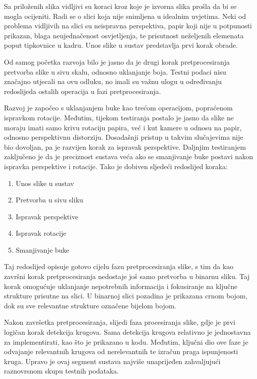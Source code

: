 \documentclass{foi}
\begin{document}
Sa priloženih slika vidljivi su koraci kroz koje je izvorna slika prošla da bi se mogla ocijeniti. Radi se o slici koja nije snimljena u idealnim uvjetima. Neki od problema vidljivih na slici su neispravna perspektiva, papir koji nije u potpunosti prikazan, blaga neujednačenost osvjetljenja, te prisutnost neželjenih elemenata poput tipkovnice u kadru. Unos slike u sustav predstavlja prvi korak obrade.

Od samog početka razvoja bilo je jasno da je drugi korak pretprocesiranja pretvorba slike u sivu skalu, odnosno uklanjanje boja. Testni podaci nisu značajno utjecali na ovu odluku, no imali su važnu ulogu u određivanju redoslijeda ostalih operacija u fazi pretprocesiranja.

Razvoj je započeo s uklanjanjem buke kao trećom operacijom, popraćenom ispravkom rotacije. Međutim, tijekom testiranja postalo je jasno da slike ne moraju imati samo krivu rotaciju papira, već i kut kamere u odnosu na papir, odnosno perspektivnu distorziju. Dosadašnji pristup u takvim slučajevima nije bio dovoljan, pa je razvijen korak za ispravak perspektive. Daljnjim testiranjem zaključeno je da je preciznost sustava veća ako se smanjivanje buke postavi nakon ispravka perspektive i rotacije. Tako je dobiven sljedeći redoslijed koraka:

\begin{enumerate}
    \item Unos slike u sustav
    \item Pretvorba u sivu sliku
    \item Ispravak perspektive
    \item Ispravak rotacije
    \item Smanjivanje buke
\end{enumerate}

Taj redoslijed opisuje gotovo cijelu fazu pretprocesiranja slike, s tim da kao završni korak pretprocesiranja nedostaje još samo pretvorba u binarnu sliku. Taj korak omogućuje uklanjanje nepotrebnih informacija i fokusiranje na ključne strukture prisutne na slici. U binarnoj slici pozadina je prikazana crnom bojom, dok su sve relevantne strukture označene bijelom bojom.

Nakon završetka pretprocesiranja, slijedi faza procesiranja slike, gdje je prvi logičan korak detekcija krugova. Sama detekcija krugova relativno je jednostavna za implementirati, kao što je prikazano u kodu. Međutim, ključni dio ove faze je odvajanje relevantnih krugova od nerelevantnih te izračun praga ispunjenosti kruga. Upravo je ovaj segment sustava najviše unaprijeđen zahvaljujući raznovrsnom skupu testnih podataka.
\end{document}
